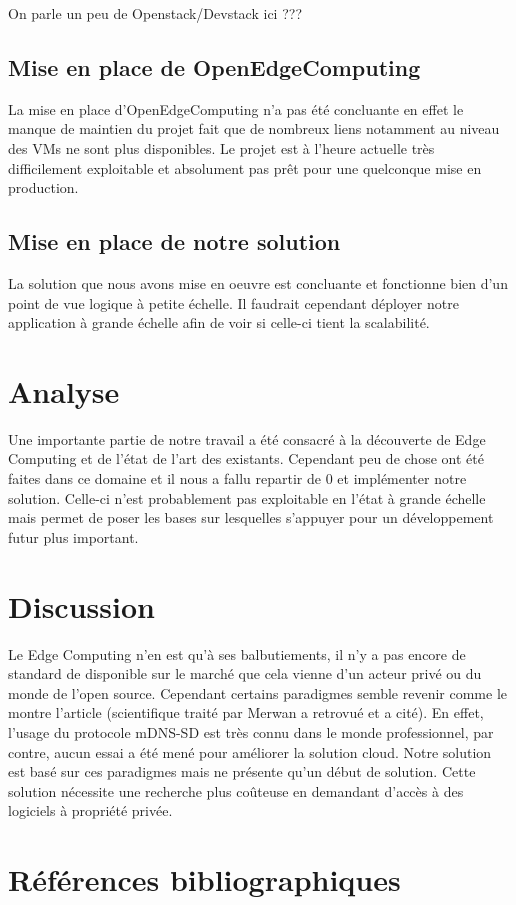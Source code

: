\documentclass[twocolumn,a4paper]{IEEEtranfr}
\begin{document}
On parle un peu de Openstack/Devstack ici ???

\subsection{Mise en place de OpenEdgeComputing}

La mise en place d’OpenEdgeComputing n’a pas été concluante en effet le manque de maintien du projet fait que de nombreux liens notamment au niveau des VMs ne sont plus disponibles. Le projet est à l’heure actuelle très difficilement exploitable et absolument pas prêt pour une quelconque mise en production.

\subsection{Mise en place de notre solution}

La solution que nous avons mise en oeuvre est concluante et fonctionne bien d’un point de vue logique à petite échelle. Il faudrait cependant déployer notre application à grande échelle afin de voir si celle-ci tient la scalabilité.

\section{Analyse}

Une importante partie de notre travail a été consacré à la découverte de Edge Computing et de l’état de l’art des existants. Cependant peu de chose ont été faites dans ce domaine et il nous a fallu repartir de 0 et implémenter notre solution. Celle-ci n’est probablement pas exploitable en l’état à grande échelle mais permet de poser les bases sur lesquelles s’appuyer pour un développement futur plus important.

\section{Discussion}

Le Edge Computing n’en est qu’à ses balbutiements, il n’y a pas encore de standard de disponible sur le marché que cela vienne d’un acteur privé ou du monde de l’open source. Cependant certains paradigmes semble revenir comme le montre l’article (scientifique traité par Merwan a retrovué et a cité). En effet, l’usage du protocole mDNS-SD est très connu dans le monde professionnel, par contre, aucun essai a été mené pour améliorer la solution cloud. Notre solution est basé sur ces paradigmes mais ne présente qu’un début de solution. Cette solution nécessite une recherche plus coûteuse en demandant d’accès à des logiciels à propriété privée.


\section{Références bibliographiques}

%
\end{document}
